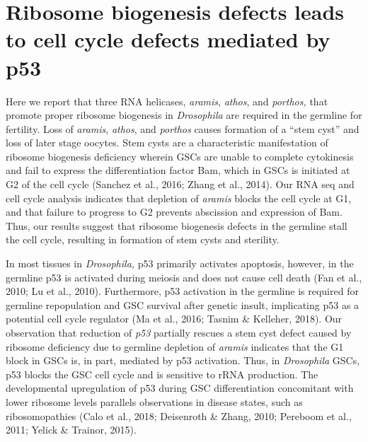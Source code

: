 \documentclass[12pt,twoside]{reedthesis}
\begin{document}
\hypertarget{ribosome-biogenesis-defects-leads-to-cell-cycle-defects-mediated-by-p53}{%
\section{Ribosome biogenesis defects leads to cell cycle defects mediated by p53}\label{ribosome-biogenesis-defects-leads-to-cell-cycle-defects-mediated-by-p53}}

Here we report that three RNA helicases, \emph{aramis}, \emph{athos}, and
\emph{porthos,} that promote proper ribosome biogenesis in \emph{Drosophila} are
required in the germline for fertility. Loss of \emph{aramis}, \emph{athos}, and
\emph{porthos} causes formation of a ``stem cyst'' and loss of later stage
oocytes. Stem cysts are a characteristic manifestation of ribosome
biogenesis deficiency wherein GSCs are unable to complete cytokinesis
and fail to express the differentiation factor Bam, which in GSCs is
initiated at G2 of the cell cycle (Sanchez et al., 2016; Zhang et al., 2014). Our
RNA seq and cell cycle analysis indicates that depletion of \emph{aramis}
blocks the cell cycle at G1, and that failure to progress to G2 prevents
abscission and expression of Bam. Thus, our results suggest that
ribosome biogenesis defects in the germline stall the cell cycle,
resulting in formation of stem cysts and sterility.

In most tissues in \emph{Drosophila,} p53 primarily activates apoptosis,
however, in the germline p53 is activated during meiosis and does not
cause cell death (Fan et al., 2010; Lu et al., 2010). Furthermore, p53 activation in
the germline is required for germline repopulation and GSC survival
after genetic insult, implicating p53 as a potential cell cycle
regulator (Ma et al., 2016; Tasnim \& Kelleher, 2018). Our
observation that reduction of \emph{p53} partially rescues a stem cyst defect
caused by ribosome deficiency due to germline depletion of \emph{aramis}
indicates that the G1 block in GSCs is, in part, mediated by p53
activation. Thus, in \emph{Drosophila} GSCs, p53 blocks the GSC cell cycle
and is sensitive to rRNA production. The developmental upregulation of
p53 during GSC differentiation concomitant with lower ribosome levels
parallels observations in disease states, such as ribosomopathies
(Calo et al., 2018; Deisenroth \& Zhang, 2010; Pereboom et al., 2011; Yelick \& Trainor, 2015).
\end{document}
